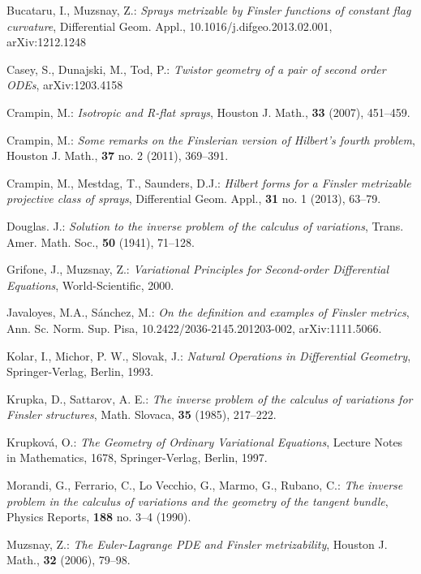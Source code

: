 \documentclass[oneside,english]{amsart}
\numberwithin{equation}{section}
\numberwithin{figure}{section}
\theoremstyle{plain}
\theoremstyle{plain}
\theoremstyle{definition}
\theoremstyle{plain}
\theoremstyle{plain}
\theoremstyle{plain}
\theoremstyle{remark}
\theoremstyle{remark}
\begin{document}
\begin{thebibliography}{99}
 Bucataru, I., Muzsnay, Z.: \emph{Sprays metrizable by
    Finsler functions of constant flag curvature}, Differential
  Geom. Appl., 10.1016/j.difgeo.2013.02.001, arXiv:1212.1248

 Casey, S., Dunajski, M., Tod, P.:
  \emph{Twistor geometry of a pair of second order ODEs}, arXiv:1203.4158

 Crampin, M.: \emph{Isotropic and R-flat sprays},
  Houston J. Math., \textbf{33} (2007), 451--459.

 Crampin, M.: \emph{Some remarks on the Finslerian
    version of Hilbert's fourth problem}, Houston J. Math.,
  \textbf{37} no. 2 (2011), 369--391.

 Crampin, M., Mestdag, T., Saunders, D.J.: \emph{Hilbert forms for a Finsler metrizable projective class of sprays},  Differential Geom. Appl.,
  \textbf{31} no. 1 (2013), 63--79.

 Douglas. J.: \emph{Solution to the inverse problem of the
    calculus of variations}, Trans. Amer. Math. Soc., \textbf{50} (1941), 71--128.

 Grifone, J., Muzsnay, Z.: \emph{Variational Principles
    for Second-order Differential Equations}, World-Scientific, 2000.

 Javaloyes, M.A., S\'anchez, M.: \emph{On the definition
    and examples of Finsler metrics}, Ann. Sc. Norm. Sup.
Pisa, 10.2422/2036-2145.201203-002, arXiv:1111.5066.  

 Kolar, I., Michor, P. W.,  Slovak, J.: \emph{Natural
    Operations in Differential Geometry}, Springer-Verlag, Berlin, 1993.

 Krupka, D.,  Sattarov, A. E.: \emph{The inverse problem
    of the calculus of variations for Finsler structures},
  Math. Slovaca, \textbf{35} (1985), 217--222.

 Krupkov\'a, O.: \emph{The Geometry of Ordinary
    Variational Equations}, Lecture Notes in Mathematics, 1678,
  Springer-Verlag, Berlin, 1997.

    Morandi, G., Ferrario, C., Lo Vecchio, G.,  Marmo, G., 
    Rubano, C.: \emph{The inverse problem in the calculus of variations and
    the geometry of the tangent bundle}, Physics Reports, \textbf{188} no. 3--4 (1990).

 Muzsnay, Z.: \emph{The Euler-Lagrange PDE and
    Finsler metrizability},  Houston J. Math., \textbf{32} (2006),
  79--98.


\end{thebibliography}
\end{document}

